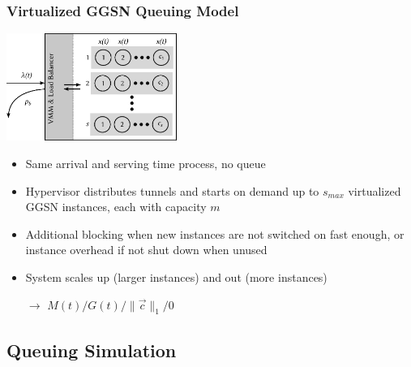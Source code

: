 \documentclass{beamer}
\begin{document}
\begin{frame}
	\frametitle{Virtualized GGSN Queuing Model}
		\begin{center}
			\includegraphics[height=3.5cm]{../../chapters/04-mobilenets/images/ggsn-virtualized.pdf}
		\end{center}

		\begin{itemize}
			\item Same arrival and serving time process, no queue
			\item Hypervisor distributes tunnels and starts on demand up to $s_{max}$ virtualized GGSN instances, each with capacity $m$
			\item Additional blocking when new instances are not switched on fast enough, or instance overhead if not shut down when unused
			\item System scales up (larger instances) and out (more instances)
			\item[$\rightarrow$] $M(t)/G(t)/\|\overrightarrow{c}\|_1/0$
		\end{itemize}
\end{frame}


\subsection{Queuing Simulation}
\end{document}
